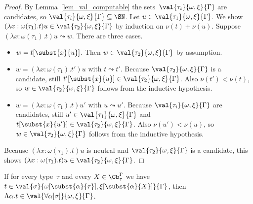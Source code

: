 \begin{proof}
 By Lemma~\ref{lem_val_computable} the
 sets~$\val{\tau_i}{\omega,\xi}{\Gamma}$ are candidates, so
 $\val{\tau_i}{\omega,\xi}{\Gamma} \subseteq \SN$. Let
 $u \in \val{\tau_1}{\omega,\xi}{\Gamma}$. We show
 $(\lambda x : \omega(\tau_1) . t) u \in
 \val{\tau_2}{\omega,\xi}{\Gamma}$ by induction on $\nu(t) +
 \nu(u)$. Suppose $(\lambda x : \omega(\tau_1) . t) u \leadsto
 w$. There are three cases.
 \begin{itemize}
 \item $w = t[\subst{x}{u}]$. Then
   $w \in \val{\tau_2}{\omega,\xi}{\Gamma}$ by assumption.
 \item $w = (\lambda x : \omega(\tau_1) . t') u$ with
   $t \leadsto t'$. Because $\val{\tau_2}{\omega,\xi}{\Gamma}$ is a
   candidate, still
   $t'[\subst{x}{u}] \in \val{\tau_2}{\omega,\xi}{\Gamma}$. Also
   $\nu(t') < \nu(t)$, so $w \in \val{\tau_2}{\omega,\xi}{\Gamma}$
   follows from the inductive hypothesis.
 \item $w = (\lambda x : \omega(\tau_1) . t) u'$ with
   $u \leadsto u'$. Because $\val{\tau_i}{\omega,\xi}{\Gamma}$ are
   candidates, still $u' \in \val{\tau_1}{\omega,\xi}{\Gamma}$ and
   $t[\subst{x}{u'}] \in \val{\tau_2}{\omega,\xi}{\Gamma}$. Also
   $\nu(u') < \nu(u)$, so $w \in \val{\tau_2}{\omega,\xi}{\Gamma}$
   follows from the inductive hypothesis.
 \end{itemize}
 Because $(\lambda x : \omega(\tau_1) . t) u$ is neutral and
 $\val{\tau_2}{\omega,\xi}{\Gamma}$ is a candidate, this shows
 $(\lambda x : \omega(\tau_1) . t) u \in
 \val{\tau_2}{\omega,\xi}{\Gamma}$.
\end{proof}

\begin{lemma}
 If for every type~$\tau$ and every $X \in \Cb_\tau^\Gamma$ we have
 $t \in
 \val{\sigma}{\omega[\subst{\alpha}{\tau}],\xi[\subst{\alpha}{X}]}{\Gamma}$,
 then
 $\Lambda \alpha . t \in
 \val{\forall\alpha[\sigma]}{\omega,\xi}{\Gamma}$.
\end{lemma}

